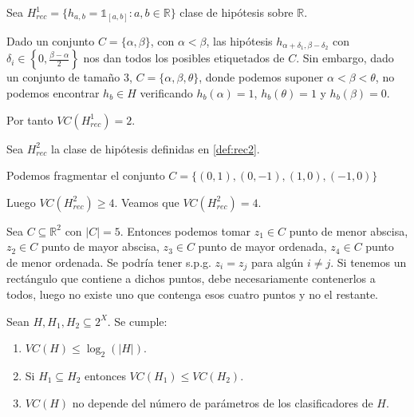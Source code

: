\begin{example}
Sea $H^1_{rec} = \{h_{a,b} = \mathds{1}_{[a,b]}: a,b\in \mathbb{R}\}$ clase de hipótesis sobre $\mathbb{R}$. 

Dado un conjunto $C=\{\alpha, \beta\}$, con $\alpha < \beta$, las hipótesis $h_{\alpha+\delta_1, \beta - \delta_2}$ con 
$\delta_i \in \left\{0, \frac{\beta - \alpha}{2} \right\}$ nos dan todos los posibles etiquetados de $C$. Sin embargo, 
dado un conjunto de tamaño 3, $C=\{\alpha, \beta, \theta\}$, donde podemos suponer $\alpha < \beta < \theta$, no
podemos encontrar $h_b \in H$ verificando $h_b(\alpha)=1$, $h_b(\theta) = 1$ y $h_b(\beta) = 0$.

Por tanto $VC(H^1_{rec}) = 2$.
\end{example}

\begin{example}
Sea $H^2_{rec}$ la clase de hipótesis definidas en \ref{def:rec2}.

Podemos fragmentar el conjunto $C = \{(0,1), (0,-1), (1,0), (-1,0)\}$


Luego $VC(H^2_{rec}) \ge 4$. Veamos que $VC(H^2_{rec}) = 4$.

Sea $C\subseteq \mathbb{R}^2$ con $|C|=5$. Entonces podemos 
tomar $z_1 \in C$ punto de menor abscisa, $z_2 \in C$ punto de mayor abscisa, $z_3 \in C$ punto de mayor 
ordenada, $z_4 \in C$ punto de menor ordenada. Se podría tener s.p.g. $z_i = z_j$ para algún $i\neq j$. Si tenemos 
un rectángulo que contiene a dichos puntos, debe necesariamente contenerlos a todos, luego no existe uno que contenga esos
cuatro puntos y no el restante.
\end{example}


\begin{fact}
Sean $H,H_1, H_2 \subseteq 2^X$. Se cumple:
\begin{enumerate}[i]
 \item $VC(H) \le \log_2(|H|)$.
 \item Si $H_1 \subseteq H_2$ entonces $VC(H_1) \le VC(H_2)$.
 \item $VC(H)$ no depende del número de parámetros de los clasificadores de $H$.
\end{enumerate}

\label{fact:props-vc}
\end{fact}

